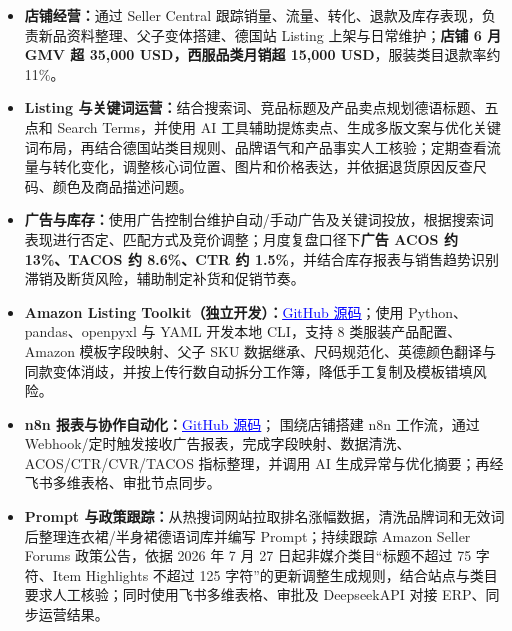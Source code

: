 \documentclass[10pt, a4paper]{article}
\begin{document}
\begin{itemize}
  \item {\fontsize{9}{12}\selectfont\textbf{店铺经营：}通过 Seller Central 跟踪销量、流量、转化、退款及库存表现，负责新品资料整理、父子变体搭建、德国站 Listing 上架与日常维护；\textbf{店铺 6 月 GMV 超 35,000 USD，西服品类月销超 15,000 USD}，服装类目退款率约 11\%。}

  \item {\fontsize{9}{12}\selectfont\textbf{Listing 与关键词运营：}结合搜索词、竞品标题及产品卖点规划德语标题、五点和 Search Terms，并使用 AI 工具辅助提炼卖点、生成多版文案与优化关键词布局，再结合德国站类目规则、品牌语气和产品事实人工核验；定期查看流量与转化变化，调整核心词位置、图片和价格表达，并依据退货原因反查尺码、颜色及商品描述问题。}

  \item {\fontsize{9}{12}\selectfont\textbf{广告与库存：}使用广告控制台维护自动/手动广告及关键词投放，根据搜索词表现进行否定、匹配方式及竞价调整；月度复盘口径下\textbf{广告 ACOS 约 13\%、TACOS 约 8.6\%、CTR 约 1.5\%}，并结合库存报表与销售趋势识别滞销及断货风险，辅助制定补货和促销节奏。}

  \item {\fontsize{9}{12}\selectfont\textbf{Amazon Listing Toolkit（独立开发）：}\href{https://github.com/binn-997/Amazon-Listing-Toolkit}{\textcolor{blue}{\underline{GitHub 源码}}}；使用 Python、pandas、openpyxl 与 YAML 开发本地 CLI，支持 8 类服装产品配置、Amazon 模板字段映射、父子 SKU 数据继承、尺码规范化、英德颜色翻译与同款变体消歧，并按上传行数自动拆分工作簿，降低手工复制及模板错填风险。}

  \item {\fontsize{9}{12}\selectfont\textbf{n8n 报表与协作自动化：}\href{https://github.com/binn-997/n8n-feishu-ai-ad-report}{\textcolor{blue}{\underline{GitHub 源码}}}； 围绕店铺搭建 n8n 工作流，通过 Webhook/定时触发接收广告报表，完成字段映射、数据清洗、ACOS/CTR/CVR/TACOS 指标整理，并调用 AI 生成异常与优化摘要；再经飞书多维表格、审批节点同步。}

  \item {\fontsize{9}{12}\selectfont\textbf{Prompt 与政策跟踪：}从热搜词网站拉取排名涨幅数据，清洗品牌词和无效词后整理连衣裙/半身裙德语词库并编写 Prompt；持续跟踪 Amazon Seller Forums 政策公告，依据 2026 年 7 月 27 日起非媒介类目“标题不超过 75 字符、Item Highlights 不超过 125 字符”的更新调整生成规则，结合站点与类目要求人工核验；同时使用飞书多维表格、审批及 DeepseekAPI 对接 ERP、同步运营结果。}

\end{itemize}
\end{document}
